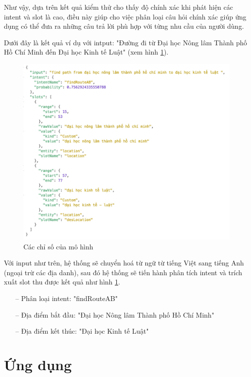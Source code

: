 Như vậy, dựa trên kết quả kiểm thử cho thấy độ chính xác khi phát hiện các intent và slot là cao, điều này giúp cho việc phân loại câu hỏi chính xác giúp ứng dụng có thể đưa ra những câu trả lời phù hợp với từng nhu cầu của người dùng.

Dưới đây là kết quả ví dụ với intput: "Đường đi từ Đại học Nông lâm Thành phố Hồ Chí Minh đến Đại học Kinh tế Luật" (xem hình \ref{fig:detect-intent}).

\begin{figure}[htp]
    \centering
    \includegraphics[width=15cm]{images/detect_intent.jpg}
    \caption{Các chỉ số của mô hình}
    \label{fig:detect-intent}
\end{figure}

Với input như trên, hệ thống sẽ chuyển hoá từ ngữ từ tiếng Việt sang tiếng Anh (ngoại trừ các địa danh), sau đó hệ thống sẽ tiến hành phân tích intent và trích xuất slot thu được kết quả như hình \ref{fig:detect-intent}.
\begin{itemize}
    \item[--] Phân loại intent: "findRouteAB"
    \item[--] Địa điểm bắt đầu: "Đại học Nông lâm Thành phố Hồ Chí Minh"
    \item[--] Địa điểm kết thúc: "Đại học Kinh tế Luật"
\end{itemize}

\section{Ứng dụng}
